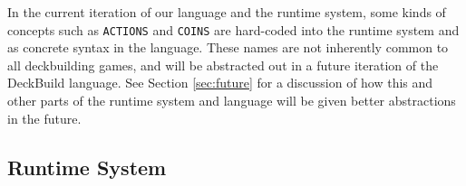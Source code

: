In the current iteration of our language and the runtime system, some kinds
of concepts such as \texttt{ACTIONS} and \texttt{COINS}
are hard-coded into the runtime system and as concrete syntax in the language.
These names are not inherently common to all deckbuilding games, and will be
abstracted out in a future iteration of the DeckBuild language. See Section
\ref{sec:future} for a discussion of how this and other parts of the runtime
system and language will be given better abstractions in the future.

\subsection{Runtime System}


